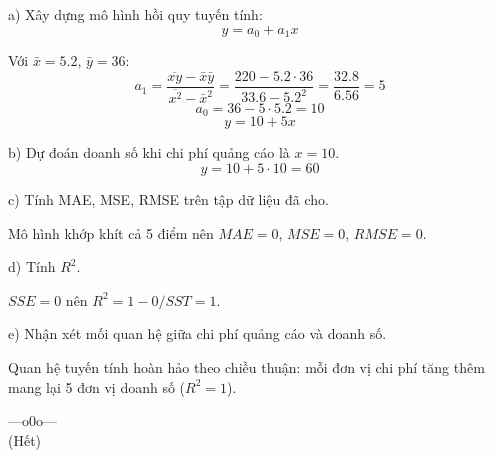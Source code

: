 \documentclass[a4paper,12pt]{article}
\begin{document}
a) Xây dựng mô hình hồi quy tuyến tính:
\[ y = a_0 + a_1 x \]

Với $\bar{x} = 5.2$, $\bar{y} = 36$:
\[ a_1 = \frac{\overline{xy} - \bar{x}\bar{y}}{\overline{x^2} - \bar{x}^2}
      = \frac{220 - 5.2 \cdot 36}{33.6 - 5.2^2}
      = \frac{32.8}{6.56} = 5 \]
\[ a_0 = 36 - 5 \cdot 5.2 = 10 \]
\[ y = 10 + 5x \]

b) Dự đoán doanh số khi chi phí quảng cáo là $x = 10$.
\[ \hat{y} = 10 + 5 \cdot 10 = 60 \]

c) Tính MAE, MSE, RMSE trên tập dữ liệu đã cho.

Mô hình khớp khít cả 5 điểm nên $MAE = 0$, $MSE = 0$, $RMSE = 0$.

d) Tính $R^2$.

$SSE = 0$ nên $R^2 = 1 - 0/SST = 1$.

e) Nhận xét mối quan hệ giữa chi phí quảng cáo và doanh số.

Quan hệ tuyến tính hoàn hảo theo chiều thuận: mỗi đơn vị chi phí tăng thêm
mang lại 5 đơn vị doanh số ($R^2 = 1$).

\begin{center}
---o0o--- \\[0.3cm]
(Hết)
\end{center}
\end{document}
